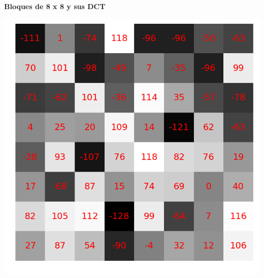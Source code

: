 \documentclass{beamer}
\begin{document}
\begin{frame}


    \textbf{Bloques de 8 x 8 y sus DCT}

    \begin{center}
        \includegraphics[scale=0.12]{fig/8x8random0.png}
        \hspace{0.5cm}

\end{center}
\end{frame}
\end{document}
